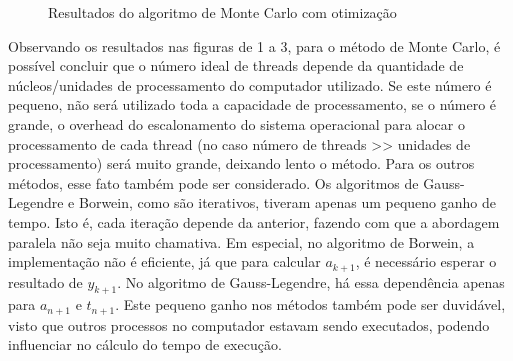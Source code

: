 \documentclass[a4paper]{article}
\begin{document}
\begin{figure}[float=h]
	\begin{center}
	\end{center}
	\caption{Resultados do algoritmo de Monte Carlo com otimização}
\end{figure}

Observando os resultados nas figuras de 1 a 3, para o método de Monte Carlo, é possível concluir que o 
número ideal de threads depende da quantidade de núcleos/unidades de processamento
do computador utilizado. Se este número é pequeno, não será utilizado toda a capacidade 
de processamento, se o número é grande, o overhead do escalonamento do sistema operacional 
para alocar o processamento de cada thread (no caso número de threads >> unidades de processamento) 
será muito grande, deixando lento o método. Para os outros métodos, esse fato também
pode ser considerado. Os algoritmos de Gauss-Legendre e Borwein, como são iterativos,
tiveram apenas um pequeno ganho de tempo. Isto é, cada iteração depende da anterior,
fazendo com que a abordagem paralela não seja muito chamativa. Em especial, no
algoritmo de Borwein, a implementação não é eficiente, já que para calcular \begin{math}a_{k+1}\end{math}, 
é necessário esperar o resultado de \begin{math}y_{k+1}\end{math}. No algoritmo de
Gauss-Legendre, há essa dependência apenas para \begin{math}a_{n+1}\end{math} e \begin{math}t_{n+1}\end{math}. Este pequeno ganho nos
métodos também pode ser duvidável, visto que outros processos no computador 
estavam sendo executados, podendo influenciar no cálculo do tempo de execução. 
\end{document}
